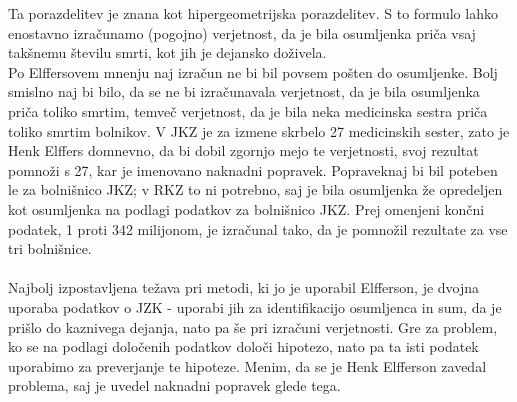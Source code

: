 \documentclass[mat1, tisk]{fmfdelo}
\theoremstyle{definition} %
\theoremstyle{trditev} %
\theoremstyle{izrek}
\begin{document}
Ta porazdelitev je znana kot hipergeometrijska porazdelitev. S to formulo lahko enostavno izračunamo (pogojno) verjetnost, da je bila osumljenka 
priča vsaj takšnemu številu smrti, kot jih je dejansko doživela.\\
Po Elffersovem mnenju naj izračun ne bi bil povsem pošten do osumljenke. Bolj smislno naj bi bilo, da se ne bi izračunavala verjetnost, da je 
bila osumljenka priča toliko smrtim, temveč verjetnost, da je bila neka medicinska sestra priča toliko smrtim bolnikov. V JKZ je za izmene skrbelo 
27 medicinskih sester, zato je Henk Elffers domnevno, da bi dobil zgornjo mejo te verjetnosti, svoj rezultat pomnoži s 27, kar je imenovano 
naknadni popravek. Popraveknaj bi bil poteben le za bolnišnico JKZ; v RKZ to ni potrebno, saj je bila osumljenka že opredeljen kot osumljenka 
na podlagi podatkov za bolnišnico JKZ. Prej omenjeni končni podatek, 1 proti 342 milijonom, je izračunal tako, da je pomnožil rezultate za vse 
tri bolnišnice.\\\\
Najbolj izpostavljena težava pri metodi, ki jo je uporabil Elfferson, je dvojna uporaba podatkov o JZK - uporabi jih za identifikacijo osumljenca 
in sum, da je prišlo do kaznivega dejanja, nato pa še pri izračuni verjetnosti. Gre za problem, ko se na podlagi določenih podatkov določi hipotezo, nato 
pa ta isti podatek uporabimo za preverjanje te hipoteze. Menim, da se je Henk Elfferson zavedal problema, saj je uvedel naknadni popravek glede tega. 

\end{document}
